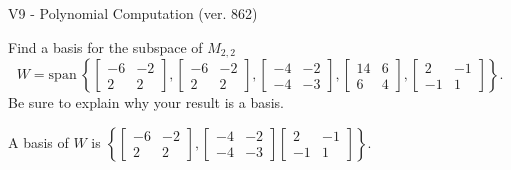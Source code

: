 \begin{exercise}
  \begin{exerciseTitle}V9 - Polynomial Computation (ver. 862)\end{exerciseTitle}
  \begin{exerciseStatement}
    Find a basis for the subspace of \(M_{2,2}\) 
\[W=\mathrm{span}\ \left\{\left[\begin{array}{cc}
-6 & -2 \\
2 & 2
\end{array}\right] , \left[\begin{array}{cc}
-6 & -2 \\
2 & 2
\end{array}\right] , \left[\begin{array}{cc}
-4 & -2 \\
-4 & -3
\end{array}\right] , \left[\begin{array}{cc}
14 & 6 \\
6 & 4
\end{array}\right] , \left[\begin{array}{cc}
2 & -1 \\
-1 & 1
\end{array}\right]\right\}.\]
 Be sure to explain why your result is a basis.


  \end{exerciseStatement}
  \begin{exerciseAnswer}
   A basis of \(W\) is  \(\left\{\left[\begin{array}{cc}
-6 & -2 \\
2 & 2
\end{array}\right] , \left[\begin{array}{cc}
-4 & -2 \\
-4 & -3
\end{array}\right] \left[\begin{array}{cc}
2 & -1 \\
-1 & 1
\end{array}\right]\right\}\).
  


  \end{exerciseAnswer}
\end{exercise}
